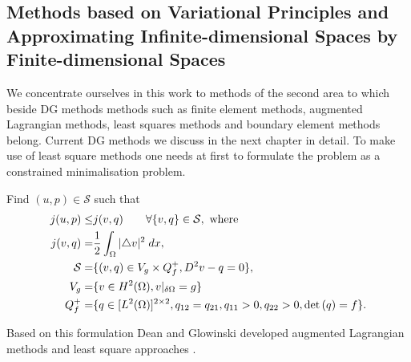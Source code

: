 \subsection{Methods based on Variational Principles and Approximating Infinite-dimensional Spaces by Finite-dimensional Spaces}
 We concentrate ourselves in this work to methods of the second area to which beside DG methods methods such as finite element methods, augmented Lagrangian methods, least squares methods and boundary element methods belong. Current DG methods we discuss in the next chapter in detail.
To make use of least square methods one needs at first to formulate the \MA problem as a constrained minimalisation problem.
\begin{definition}
Find $(u,p) \in \mathcal{S}$ such that
\begin{align}
	j(u,p) \leq& j(v,q) \qquad \forall \{v,q\} \in \mathcal{S}, \text{ where }\\
	j(v,q)  =& \frac 1 2 \int_{\Omega} {{|\triangle v |^2}\;dx}, \\
	\mathcal{S} =& \{(v,q)\in V_g \times Q^+_f, D^2v-q =0\},\\
	V_g =& \{v \in H^2(\Omega), v \arrowvert_{\delta \Omega}=g\} \\
	Q^+_f =& \{q \in [L^2(\Omega)]^{2\times2} , q_{12} =q_{21},  q_{11} > 0,q_{22} > 0, \det{\left(q\right)} = f\}.
\end{align}

\end{definition}
Based on this formulation Dean and Glowinski developed augmented Lagrangian methods and least square approaches \cite{DG2004,DG2006,DG2006a}.

